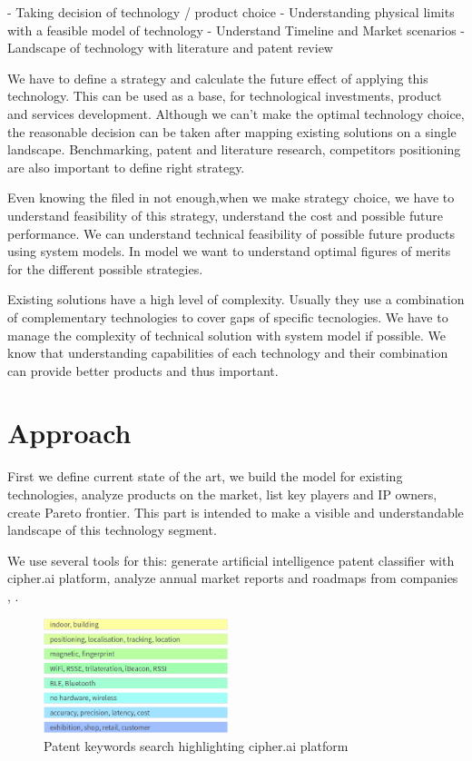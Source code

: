 -  Taking decision of technology / product choice
-  Understanding physical limits with a feasible model of technology
-  Understand Timeline and Market  scenarios
-  Landscape of technology with literature and patent review


We have to define a strategy and calculate the future effect of applying this technology.
This can be used as a base, for technological investments, product and services development.
Although we can't make the optimal technology choice, the reasonable decision can be taken after mapping existing solutions on a single landscape. Benchmarking, patent and literature research, competitors positioning are also important to define right strategy.

Even knowing the filed in not enough,when we make strategy choice, we have to understand feasibility of this strategy, understand the cost and possible future performance. We can understand technical feasibility of possible future products using system models. In model we want to understand optimal figures of merits for the different possible strategies.

Existing solutions have a high level of complexity. Usually they use a combination of complementary technologies to cover gaps of specific tecnologies. We have to manage the complexity of technical solution with system model if possible. We know that understanding capabilities of each technology and their combination can provide better products and thus important.

\section{Approach}

First we define current state of the art, we build the model for existing technologies, analyze products on the market, list key players and IP owners, create Pareto frontier. This part is intended to make a visible and understandable landscape of this technology segment.

We use several tools for this: generate artificial intelligence patent classifier with cipher.ai platform, analyze annual market reports and roadmaps from companies \cite{Infsoft_wp}, \cite{trends2019}.

\begin{figure}[ht]
	\centering
	\includegraphics[width=0.48\textwidth]{graphics/roadmap/patents/color.png}
	\caption{Patent keywords search highlighting cipher.ai platform}
	\label{fig:Patent-highlighting}
\end{figure}

